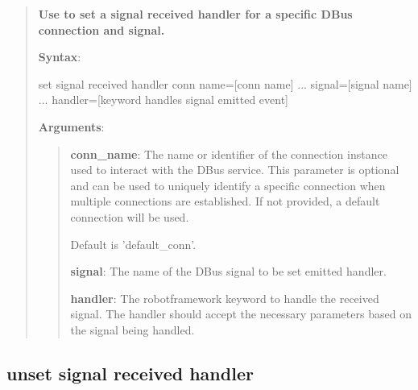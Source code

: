 \begin{quote}
\textbf{Use to set a signal received handler for a specific DBus connection and signal.}

\textbf{Syntax}:

\begin{robotcode}
set signal received handler	conn name=[conn name] 
...                        	signal=[signal name]
...                        	handler=[keyword handles signal emitted event]
\end{robotcode}

\textbf{Arguments}:

\begin{quote}
\textbf{conn\_name}: The name or identifier of the connection instance used to interact with the DBus service.
  This parameter is optional and can be used to uniquely identify a specific connection
  when multiple connections are established. If not provided, a default connection will be used.

  Default is 'default\_conn'.

\vspace{\baselineskip}

\textbf{signal}: The name of the DBus signal to be set emitted handler.

\vspace{\baselineskip}

\textbf{handler}:  The robotframework keyword to handle the received signal.
  The handler should accept the necessary parameters based on the signal being handled.
\end{quote}
\end{quote}

\hypertarget{description-unset-signal-received-handler}{%
\subsection{\texorpdfstring{\textbf{unset signal received handler}}{unset signal received handler}}\label{description-unset-signal-received-handler}}


